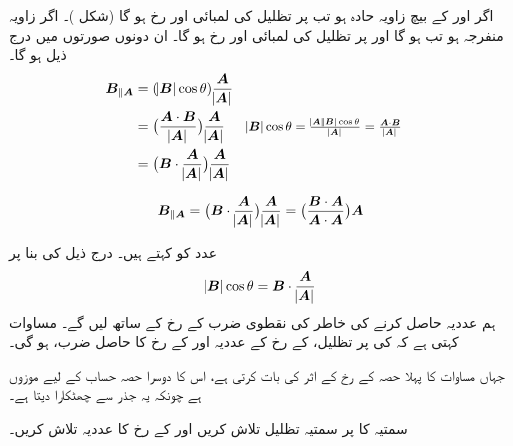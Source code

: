 اگر  اور  کے بیچ زاویہ حادہ ہو تب  پر تظلیل  کی لمبائی  اور رخ  ہو گا (شکل )۔ اگر  زاویہ منفرجہ ہو  تب  ہو گا اور  پر تظلیل  کی لمبائی  اور رخ  ہو گا۔ ان دونوں صورتوں میں درج ذیل ہو گا۔
\begin{align*}
{\ensuremath{{\boldsymbol{B}}}}_{\parallel {\ensuremath{{\boldsymbol{A}}}}}&=(\abs{{{\boldsymbol{B}}}}\cos\theta)\frac{{{\boldsymbol{A}}}}{\abs{{{\boldsymbol{A}}}}}\\
&=\big(\frac{{{\boldsymbol{A}}}\cdot{\ensuremath{{\boldsymbol{B}}}}}{\abs{{{\boldsymbol{A}}}}}\big)\frac{{{\boldsymbol{A}}}}{\abs{{{\boldsymbol{A}}}}}&&\mbox{\small $ \abs{{{\boldsymbol{B}}}}\cos\theta=\frac{\abs{{{\boldsymbol{A}}}}\abs{{{\boldsymbol{B}}}}\cos\theta}{\abs{{{\boldsymbol{A}}}}}=\frac{{{\boldsymbol{A}}}\cdot{\ensuremath{{\boldsymbol{B}}}}}{\abs{{{\boldsymbol{A}}}}}$}\\
&=\big({{\boldsymbol{B}}}\cdot\frac{{{\boldsymbol{A}}}}{\abs{{{\boldsymbol{A}}}}}\big)\frac{{{\boldsymbol{A}}}}{\abs{{{\boldsymbol{A}}}}}
\end{align*}

\begin{align}\label{مساوات_سمتیہ_تظلیل_الف}
{\ensuremath{{\boldsymbol{B}}}}_{\parallel {\ensuremath{{\boldsymbol{A}}}}}=\big({{\boldsymbol{B}}}\cdot\frac{{{\boldsymbol{A}}}}{\abs{{{\boldsymbol{A}}}}}\big)\frac{{{\boldsymbol{A}}}}{\abs{{{\boldsymbol{A}}}}}=\big(\frac{{{\boldsymbol{B}}}\cdot{\ensuremath{{\boldsymbol{A}}}}}{{{\boldsymbol{A}}}\cdot{\ensuremath{{\boldsymbol{A}}}}}\big){{\boldsymbol{A}}}
\end{align}

عدد  کو  کہتے ہیں۔ درج ذیل کی بنا پر 
\begin{align}\label{مساوات_سمتیہ_غیر_سمتی_جزو}
\abs{{{\boldsymbol{B}}}}\cos\theta={{\boldsymbol{B}}}\cdot\frac{{{\boldsymbol{A}}}}{\abs{{{\boldsymbol{A}}}}}
\end{align}
ہم عددیہ  حاصل کرنے کی خاطر  کی نقطوی ضرب  کے رخ کے ساتھ لیں گے۔ مساوات  کہتی ہے کہ  کی  پر تظلیل،  کے رخ  کے عددیہ    اور   کے رخ کا حاصل ضرب،   ہو گی۔ 

جہاں مساوات  کا پہلا حصہ  کے رخ  کے اثر کی بات کرتی ہے، اس کا دوسرا حصہ حساب کے لیے موزوں ہے چونکہ یہ جذر سے چھٹکارا دیتا ہے۔

سمتیہ  کا  پر سمتیہ تظلیل تلاش کریں اور  کے رخ  کا عددیہ   تلاش کریں۔

